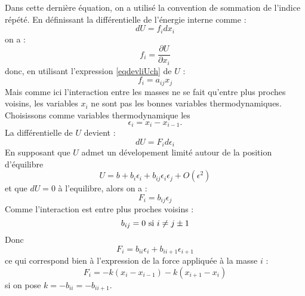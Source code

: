 \documentclass[12pt]{book}
\begin{document}
Dans cette derni\`ere \'equation, on a utilis\'e la convention de
sommation de l'indice r\'ep\'et\'e.
En d\'efinissant la diff\'erentielle de l'\'energie interne comme :
\begin{equation}
dU=f_i dx_i
\end{equation}
on a :
\begin{equation}
f_i=\frac{\partial U}{\partial x_i}
\end{equation}
donc, en utilisant l'expression \ref{eqdevliUch} de $U$ :
\begin{equation}
f_i=a_{ij}x_j
\end{equation}
Mais comme ici l'interaction entre les masses ne se fait qu'entre plus
proches voisins, les variables $x_i$ ne sont pas les bonnes variables
thermodynamiques. Choisissons comme variables thermodynamique les
\begin{equation}
\epsilon_i=x_i-x_{i-1}.
\end{equation}
La diff\'erentielle de $U$ devient :
\begin{equation}
dU=F_id\epsilon_i
\end{equation}
En supposant que $U$ admet un d\'evelopement limit\'e autour de la
position d'\'equilibre
\begin{equation}
U=b+b_i\epsilon_i+b_{ij}\epsilon_i\epsilon_j+O(\epsilon^2)
\end{equation}
et que $dU=0$ \`a l'equilibre, alors on a :
\begin{equation}
F_i=b_{ij}\epsilon_j
\end{equation}
Comme l'interaction est entre plus proches voisins :
\begin{equation}
b_{ij}=0 {\rm\ si\ } i\neq j\pm 1
\end{equation}
Donc 
\begin{equation}
F_i=b_{ii}\epsilon_i+b_{ii+1}\epsilon_{i+1}
\end{equation}
ce qui correspond bien \`a l'expression de la force appliqu\'ee \`a la
masse $i$ :
\begin{equation}
F_i=-k(x_{i}-x_{i-1})-k(x_{i+1}-x_{i})
\end{equation}
si on pose $k=-b_{ii}=-b_{ii+1}$.
\end{document}
